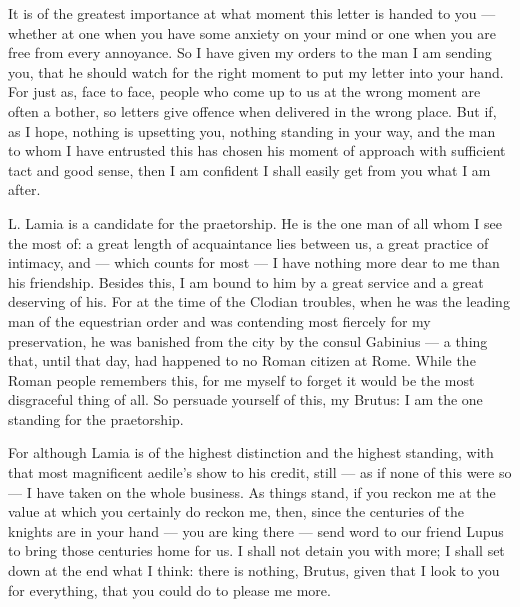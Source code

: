 

 It is of the greatest importance at what moment this letter is handed to you --- whether at one when you have some anxiety on your mind or one when you are free from every annoyance. So I have given my orders to the man I am sending you, that he should watch for the right moment to put my letter into your hand. For just as, face to face, people who come up to us at the wrong moment are often a bother, so letters give offence when delivered in the wrong place. But if, as I hope, nothing is upsetting you, nothing standing in your way, and the man to whom I have entrusted this has chosen his moment of approach with sufficient tact and good sense, then I am confident I shall easily get from you what I am after.

 L. Lamia is a candidate for the praetorship. He is the one man of all whom I see the most of: a great length of acquaintance lies between us, a great practice of intimacy, and --- which counts for most --- I have nothing more dear to me than his friendship. Besides this, I am bound to him by a great service and a great deserving of his. For at the time of the Clodian troubles, when he was the leading man of the equestrian order and was contending most fiercely for my preservation, he was banished from the city by the consul Gabinius --- a thing that, until that day, had happened to no Roman citizen at Rome. While the Roman people remembers this, for me myself to forget it would be the most disgraceful thing of all. So persuade yourself of this, my Brutus: I am the one standing for the praetorship.

 For although Lamia is of the highest distinction and the highest standing, with that most magnificent aedile's show to his credit, still --- as if none of this were so --- I have taken on the whole business. As things stand, if you reckon me at the value at which you certainly do reckon me, then, since the centuries of the knights are in your hand --- you are king there --- send word to our friend Lupus to bring those centuries home for us. I shall not detain you with more; I shall set down at the end what I think: there is nothing, Brutus, given that I look to you for everything, that you could do to please me more.
